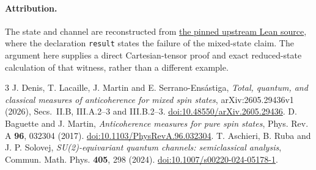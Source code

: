 \documentclass[11pt]{article}
\begin{document}
\paragraph{Attribution.}
The state and channel are reconstructed from
\href{https://github.com/the-omega-institute/trureturing/blob/d1876cfbbef8c13023311126691b180eefa69569/D5/S3/Quantum/Measurement/AnticoherenceTraceDistanceRefutation.lean}{the pinned upstream Lean source},
where the declaration \texttt{result} states the failure of the mixed-state
claim. The argument here supplies a direct Cartesian-tensor proof and exact
reduced-state calculation of that witness, rather than a different example.

\begin{thebibliography}{3}
J. Denis, T. Lacaille, J. Martin and E. Serrano-Ens\'astiga,
\emph{Total, quantum, and classical measures of anticoherence for mixed spin
states}, arXiv:2605.29436v1 (2026), Secs.~II.B, III.A.2--3 and III.B.2--3.
\href{https://doi.org/10.48550/arXiv.2605.29436}{doi:10.48550/arXiv.2605.29436}.
D. Baguette and J. Martin, \emph{Anticoherence measures for pure spin states},
Phys. Rev. A \textbf{96}, 032304 (2017).
\href{https://doi.org/10.1103/PhysRevA.96.032304}{doi:10.1103/PhysRevA.96.032304}.
T. Aschieri, B. Ruba and J. P. Solovej,
\emph{SU(2)-equivariant quantum channels: semiclassical analysis},
Commun. Math. Phys. \textbf{405}, 298 (2024).
\href{https://doi.org/10.1007/s00220-024-05178-1}{doi:10.1007/s00220-024-05178-1}.
\end{thebibliography}
\end{document}
